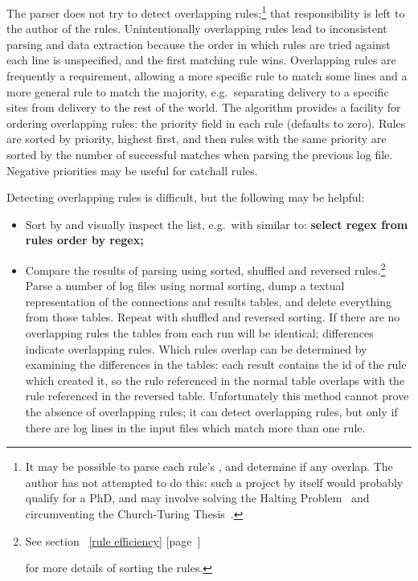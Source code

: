 \documentclass[a4paper,12pt,draft]{article}
\newcommand{\refwithpage}[1]{%
    \empty{}\ref{#1} [page~\pageref{#1}]%
}
\begin{document}
The parser does not try to detect overlapping rules;\footnote{It may be
possible to parse each rule's \regex{}, and determine if any overlap.  The
author has not attempted to do this: such a project by itself would
probably qualify for a PhD, and may involve solving the Halting
Problem~\cite{Wikipedia-halting-problem} and circumventing the
Church-Turing Thesis~\cite{Wikipedia-church-turing-thesis}.} that
responsibility is left to the author of the rules.  Unintentionally
overlapping rules lead to inconsistent parsing and data extraction because
the order in which rules are tried against each line is unspecified, and
the first matching rule wins.  Overlapping rules are frequently a
requirement, allowing a more specific rule to match some lines and a more
general rule to match the majority, e.g.\ separating \SMTP{} delivery to a
specific sites from \SMTP{} delivery to the rest of the world.  The
algorithm provides a facility for ordering overlapping rules: the priority
field in each rule (defaults to zero).  Rules are sorted by priority,
highest first, and then rules with the same priority are sorted by the
number of successful matches when parsing the previous log file.  Negative
priorities may be useful for catchall rules.

Detecting overlapping rules is difficult, but the following may be helpful:

\begin{itemize}

    \item Sort by \regex{} and visually inspect the list, e.g.\ with \SQL{}
        similar to: \textbf{select regex from rules order by regex;}

    \item Compare the results of parsing using sorted, shuffled and
        reversed rules.\footnote{See section~\refwithpage{rule efficiency}
        for more details of sorting the rules.}  Parse a number of log
        files using normal sorting, dump a textual representation of the
        connections and results tables, and delete everything from those
        tables.  Repeat with shuffled and reversed sorting.  If there are
        no overlapping rules the tables from each run will be identical;
        differences indicate overlapping rules.  Which rules overlap can be
        determined by examining the differences in the tables: each result
        contains the id of the rule which created it, so the rule
        referenced in the normal table overlaps with the rule referenced in
        the reversed table.  Unfortunately this method cannot prove the
        absence of overlapping rules; it can detect overlapping rules, but
        only if there are log lines in the input files which match more
        than one rule.

\end{itemize}
\end{document}
